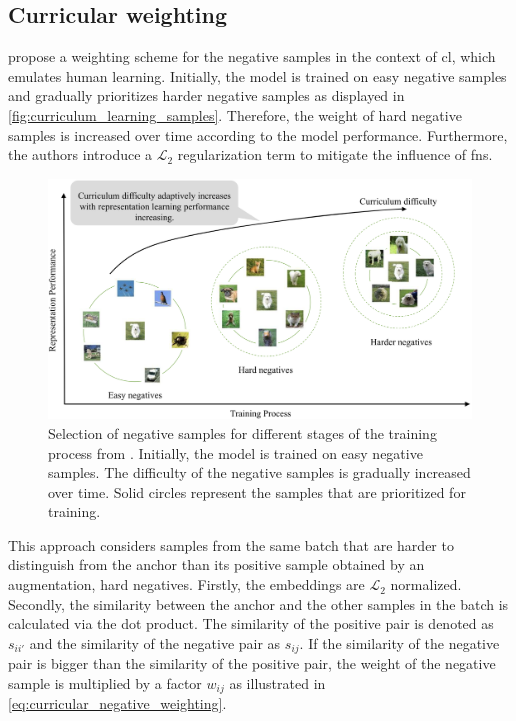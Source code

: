 \subsection{Curricular weighting}\label{subsec:curricular_weighting}

\citet{curricular_weighting_2024} propose a weighting scheme for the negative samples 
in the context of \ac{cl}, which emulates human learning.
Initially, the model is trained on easy negative samples and gradually prioritizes harder negative samples 
as displayed in \autoref{fig:curriculum_learning_samples}.
Therefore, the weight of hard negative samples is increased over time according to the model performance.
Furthermore, the authors introduce a $\mathcal{L}_2$ regularization term to mitigate the influence of \acp{fn}.

\begin{figure}[h] %
    \centering
    \includegraphics[width=360pt]{images/curriculum_learning_samples.png}
    \caption{Selection of negative samples for different stages of the training process 
    from \citet{curricular_weighting_2024}.
    Initially, the model is trained on easy negative samples.
    The difficulty of the negative samples is gradually increased over time.
    Solid circles represent the samples that are prioritized for training.
    }
    \label{fig:curriculum_learning_samples}
\end{figure}

This approach considers samples from the same batch that are harder to distinguish from the anchor 
than its positive sample obtained by an augmentation, hard negatives.
Firstly, the embeddings are $\mathcal{L}_2$ normalized.
Secondly, the similarity between the anchor and the other samples in the batch is calculated via the dot product.
The similarity of the positive pair is denoted as $s_{ii'}$ and the similarity of the negative pair as $s_{ij}$.
If the similarity of the negative pair is bigger than the similarity of the positive pair, 
the weight of the negative sample is multiplied by a factor $w_{ij}$ 
as illustrated in \eqref{eq:curricular_negative_weighting}.

